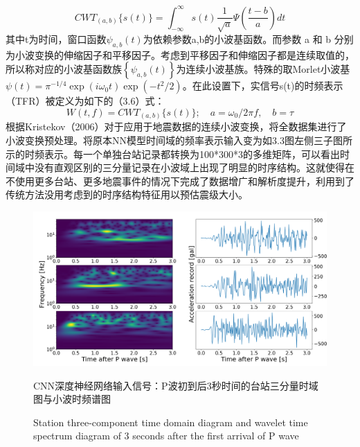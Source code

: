 \begin{equation}
C W T_{(a, b)}\{s(t)\}=\int_{-\infty}^{\infty} s(t) \frac{1}{\sqrt{a}} \Psi\left(\frac{t-b}{a}\right) d t
\end{equation}
其中t为时间，窗口函数$\psi_{a, b}(t)$为依赖参数a,b的小波基函数。而参数 a 和 b 分别为小波变换的伸缩因子和平移因子。考虑到平移因子和伸缩因子都是连续取值的，所以称对应的小波基函数族$\left\{\psi_{a, b}(t)\right\}$为连续小波基族。特殊的取Morlet小波基$\psi(t)=\pi^{-1 / 4} \exp \left(i \omega_{0} t\right) \exp \left(-t^{2} / 2\right)$。在此设置下，实信号s(t)的时频表示（TFR）被定义为如下的（3.6）式：\
\begin{equation}
W(t, f)=C W T_{(a, b)}\{s(t)\} ; \quad a=\omega_{0} / 2 \pi f,\quad  b=\tau
\end{equation}
\indent 根据Kristekov（2006）对于应用于地震数据的连续小波变换，将全数据集进行了小波变换预处理。将原本NN模型时间域的频率表示输入变为如3.3图左侧三子图所示的时频表示。每一个单独台站记录都转换为100*300*3的多维矩阵，可以看出时间域中没有直观区别的三分量记录在小波域上出现了明显的时序结构。这就使得在不使用更多台站、更多地震事件的情况下完成了数据增广和解析度提升，利用到了传统方法没用考虑到的时序结构特征用以预估震级大小。\\
\begin{figure}[h] 
\centering 
 \includegraphics[width=1.0\linewidth]{img/wavelet.jpg} 
 \renewcommand{\figurename}{图} 
\caption{CNN深度神经网络输入信号：P波初到后3秒时间的台站三分量时域图与小波时频谱图} 
\addtocounter{figure}{-1} \vspace{-5pt} 
\renewcommand{\figurename}{Fig} 
\caption{Station three-component time domain diagram and wavelet time spectrum diagram of 3 seconds after the first arrival of P wave} 
\renewcommand{\figurename}{图} 
\label{fig:network-device-influence.png} 
\end{figure}

